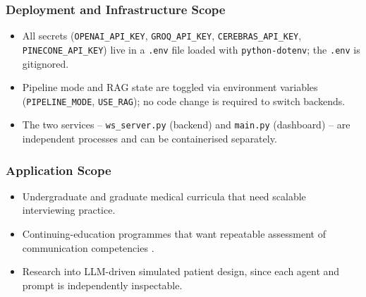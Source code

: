 \documentclass{article}
\begin{document}
\subsubsection*{Deployment and Infrastructure Scope}
\begin{itemize}
    \item All secrets (\texttt{OPENAI\_API\_KEY}, \texttt{GROQ\_API\_KEY}, \texttt{CEREBRAS\_API\_KEY}, \texttt{PINECONE\_API\_KEY}) live in a \texttt{.env} file loaded with \texttt{python-dotenv}; the \texttt{.env} is gitignored.
    \item Pipeline mode and RAG state are toggled via environment variables (\texttt{PIPELINE\_MODE}, \texttt{USE\_RAG}); no code change is required to switch backends.
    \item The two services -- \texttt{ws\_server.py} (backend) and \texttt{main.py} (dashboard) -- are independent processes and can be containerised separately.
\end{itemize}

\subsubsection*{Application Scope}
\begin{itemize}
    \item Undergraduate and graduate medical curricula that need scalable interviewing practice.
    \item Continuing-education programmes that want repeatable assessment of communication competencies \cite{Portovaras2024CurrentTA}.
    \item Research into LLM-driven simulated patient design, since each agent and prompt is independently inspectable.
\end{itemize}
\end{document}
